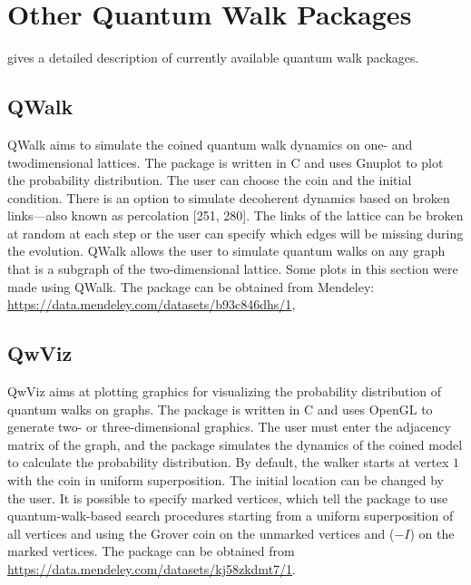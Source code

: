\chapter{Other Quantum Walk Packages}


\cite{Portugal} gives a detailed description of currently available quantum walk packages.

\section{QWalk}

QWalk aims to simulate the coined quantum walk dynamics on one- and twodimensional lattices. The package is written in C and uses Gnuplot to plot the probability distribution. The user can choose the coin and the initial condition. There is an option to simulate decoherent dynamics based on broken links—also known as percolation [251, 280]. The links of the lattice can be broken at random at each step or the user can specify which edges will be missing during the evolution. QWalk allows the user to simulate quantum walks on any graph that is a subgraph of the two-dimensional lattice. Some plots in this section were made using QWalk. The package can be obtained from Mendeley: \url{https://data.mendeley.com/datasets/b93c846dhs/1}, 


\section{QwViz}

QwViz aims at plotting graphics for visualizing the probability distribution of quantum walks on graphs. The package is written in C and uses OpenGL to generate two- or three-dimensional graphics. The user must enter the adjacency matrix of the graph, and the package simulates the dynamics of the coined model to calculate the probability distribution. By default, the walker starts at vertex $1$ with the coin in uniform superposition. The initial location can be changed by the user. It is possible to specify marked vertices, which tell the package to use quantum-walk-based search procedures starting from a uniform superposition of all vertices and using the Grover coin on the unmarked vertices and ($-I$) on the marked vertices. The package can be obtained from \url{https://data.mendeley.com/datasets/kj58zkdmt7/1}.

